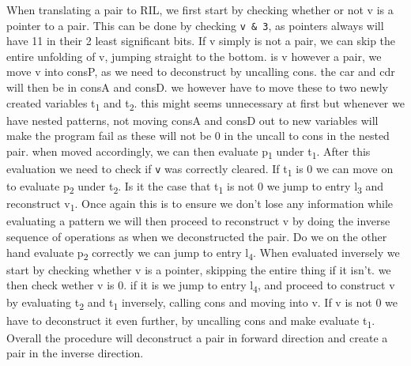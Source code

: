 \documentclass[a4paper]{article}
\begin{document}
When translating a pair to RIL, we first start by checking whether or not v is a pointer to a pair. This can be done by checking \texttt{v \& 3}, as pointers always will have 11 in their 2 least significant bits. If v simply is not a pair, we can skip the entire unfolding of v, jumping straight to the bottom. is v however a pair, we move v into consP, as we need to deconstruct by uncalling cons. the car and cdr will then be in consA and consD. we however have to move these to two newly created variables t\textsubscript{1} and t\textsubscript{2}. this might seems unnecessary at first but whenever we have nested patterns, not moving consA and consD out to new variables will make the program fail as these will not be 0 in the uncall to cons in the nested pair. when moved accordingly, we can then evaluate p\textsubscript{1} under t\textsubscript{1}. After this evaluation we need to check if \texttt{v} was correctly cleared. If t\textsubscript{1} is 0 we can move on to evaluate p\textsubscript{2} under t\textsubscript{2}. Is it the case that t\textsubscript{1} is not 0 we jump to entry l\textsubscript{3} and reconstruct v\textsubscript{1}. Once again this is to ensure we don't lose any information while evaluating a pattern we will then proceed to reconstruct v by doing the inverse sequence of operations as when we deconstructed the pair. Do we on the other hand evaluate p\textsubscript{2} correctly we can jump to entry l\textsubscript{4}. When evaluated inversely we start by checking whether v is a pointer, skipping the entire thing if it isn't. we then check wether v is 0. if it is we jump to entry l\textsubscript{4}, and proceed to construct v by evaluating t\textsubscript{2} and t\textsubscript{1} inversely, calling cons and moving into v. If v is not 0 we have to deconstruct it even further, by uncalling cons and make evaluate t\textsubscript{1}. Overall the procedure will deconstruct a pair in forward direction and create a pair in the inverse direction.
\end{document}
